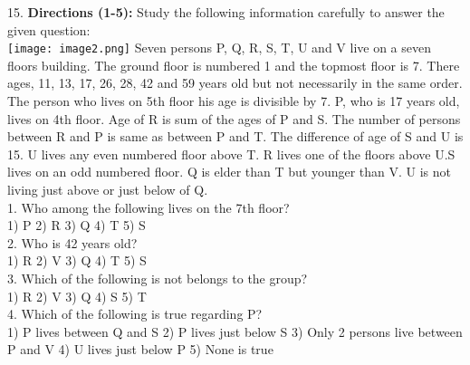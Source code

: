 \documentclass[
]{article}
\begin{document}
15. \textbf{Directions (1-5):} Study the following information carefully to answer the given question:\\
\texttt{[image: image2.png]}
Seven persons P, Q, R, S, T, U and V live on a seven floors building. The ground floor is
numbered 1 and the topmost floor is 7. There ages, 11, 13, 17, 26, 28, 42 and 59 years old but
not necessarily in the same order. The person who lives on 5th floor his age is divisible by 7.
P, who is 17 years old, lives on 4th floor. Age of R is sum of the ages of P and S. The number
of persons between R and P is same as between P and T. The difference of age of S and U is
15. U lives any even numbered floor above T. R lives one of the floors above U.S lives on an
odd numbered floor. Q is elder than T but younger than V. U is not living just above or just
below of Q.\\

1. Who among the following lives on the 7th floor?\\
1) P \hspace{2mm}2) R \hspace{2mm}3) Q \hspace{2mm}4) T \hspace{2mm}5) S\\

2. Who is 42 years old?\\
1) R \hspace{2mm}2) V \hspace{2mm}3) Q \hspace{2mm}4) T \hspace{2mm}5) S\\

3. Which of the following is not belongs to the group?\\
1) R \hspace{2mm}2) V \hspace{2mm}3) Q \hspace{2mm}4) S \hspace{2mm}5) T\\

4. Which of the following is true regarding P?\\
1) P lives between Q and S \hspace{2mm}2) P lives just below S
\hspace{2mm}3) Only 2 persons live between P and V \hspace{2mm}4) U lives just below P
\hspace{2mm}5) None is true\\
\end{document}
